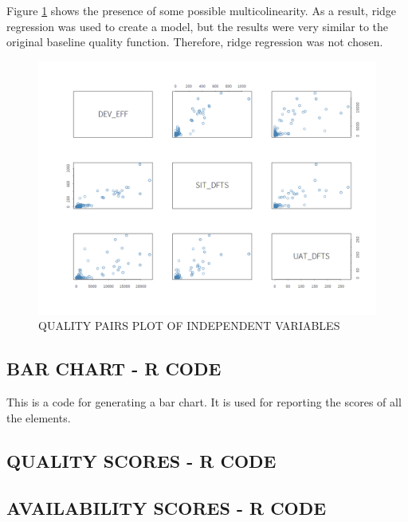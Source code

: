 \documentclass[SDSUThesis.tex]{subfiles}
\begin{document}
        Figure \ref{fig:quality-pairs} shows the presence of some
        possible multicolinearity.  As a result, ridge regression
        was used to create a model, but the results were very similar
        to the original baseline quality function. Therefore,
        ridge regression was not chosen. 
        \begin{figure}[ht]
            \centering
            \includegraphics[scale=.3]{images/quality_pairs.png}
            \caption{QUALITY PAIRS PLOT OF INDEPENDENT VARIABLES}
            \label{fig:quality-pairs}
        \end{figure}
        
    \subsection{BAR CHART - R CODE}
        This is a code for generating a bar chart.  It is used for reporting
        the scores of all the elements.
        
        
    \subsection{QUALITY SCORES - R CODE}
        
        
    \subsection{AVAILABILITY SCORES - R CODE}
        
        
\end{document}
